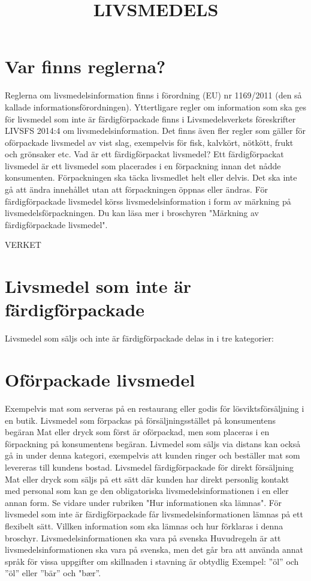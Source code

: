 \section*{Var finns reglerna?}
Reglerna om livsmedelsinformation finns i förordning (EU) nr 1169/2011 (den så kallade informationsförordningen). Yttertligare regler om information som ska ges för livsmedel som inte är färdigförpackade finns i Livsmedelsverkets föreskrifter LIVSFS 2014:4 om livsmedelsinformation. Det finns även fler regler som gäller för oförpackade livsmedel av vist slag, exempelvis för fisk, kalvkört, nötkött, frukt och grönsaker etc.
Vad är ett färdigförpackat livsmedel?
Ett färdigförpackat livsmedel är ett livsmedel som placerades i en förpackning innan det nådde konsumenten. Förpackningen ska täcka livsmedlet helt eller delvis. Det ska inte gå att ändra innehållet utan att förpackningen öppnas eller ändras.
För färdigförpackade livsmedel körss livsmedelsinformation i form av märkning på livsmedelsförpackningen. Du kan läsa mer i broschyren "Märkning av färdigförpackade livsmedel".

\title{
LIVSMEDELS
} VERKET

\section*{Livsmedel som inte är färdigförpackade}
Livsmedel som säljs och inte är färdigförpackade delas in i tre kategorier:
\section*{Oförpackade livsmedel}
Exempelvis mat som serveras på en restaurang eller godis för lösviktsförsäljning i en butik.
Livsmedel som förpackas på försäljningsstället på konsumentens begäran
Mat eller dryck som först är oförpackad, men som placeras i en förpackning på konsumentens begäran. Livmedel som säljs via distans kan också gå in under denna kategori, exempelvis att kunden ringer och beställer mat som levereras till kundens bostad.
Livsmedel färdigförpackade för direkt försäljning Mat eller dryck som säljs på ett sätt där kunden har direkt personlig kontakt med personal som kan ge den obligatoriska livsmedelsinformationen i en eller annan form. Se vidare under rubriken "Hur informationen ska lämnas".
För livsmedel som inte är färdigförpackade får livsmedelsinformationen lämnas på ett flexibelt sätt. Villken information som ska lämnas och hur förklaras i denna broschyr.
Livsmedelsinformationen ska vara på svenska
Huvudregeln är att livsmedelsinformationen ska vara på svenska, men det går bra att använda annat språk för vissa uppgifter om skillnaden i stavning är obtydlig Exempel: ”öl” och ”öl” eller ”bär” och "bær”.
